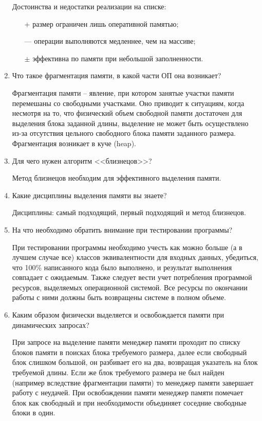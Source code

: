 \begin{enumerate}
	Достоинства и недостатки реализации на списке: 
	
	\begin{itemize}
		\item[+] размер ограничен лишь оперативной памятью;
		\item[---] операции выполняются медленнее, чем на массиве;
		\item[$\pm$] эффективна по памяти при небольшой заполненности.
	\end{itemize}

	\item Что такое фрагментация памяти, в какой части ОП она возникает?
	
	Фрагментация памяти -- явление, при котором занятые участки памяти перемешаны со свободными участками. Оно приводит к ситуациям, когда несмотря на то, что физический объем свободной памяти достаточен для выделения блока заданной длины, выделение не может быть осуществлено из-за отсутствия цельного свободного блока памяти заданного размера. Фрагментация возникает в куче (heap).
	
	\item Для чего нужен алгоритм <<близнецов>>?

	Метод близнецов необходим для эффективного выделения памяти.
	
	\item Какие дисциплины выделения памяти вы знаете?
	
	Дисциплины: самый подходящий, первый подходящий и метод близнецов.
	
	\item На  что  необходимо  обратить  внимание  при  тестировании программы? 
	
	При тестировании программы необходимо учесть как можно больше (а в  лучшем  случае  все)  классов  эквивалентности  для  входных  данных, убедиться,  что  100\%  написанного  кода  было  выполнено,  и  результат выполнения совпадает с ожидаемым. 
	Также  следует  вести  учет  потребления  программой  ресурсов, выделяемых операционной системой. Все ресурсы по окончании работы с ними должны быть возвращены системе в полном объеме.
	
	\item Каким образом физически выделяется и освобождается памяти при динамических запросах?
	
	При  запросе  на  выделение  памяти  менеджер  памяти  проходит  по списку  блоков  памяти  в  поисках  блока  требуемого  размера,  далее  если свободный блок слишком большой, он разбивает его на два, возвращая указатель на блок требуемой длины. Если же блок требуемого размера не был  найден  (например  вследствие  фрагментации  памяти)  то  менеджер памяти завершает работу с неудачей. 
	При  освобождении  памяти  менеджер  памяти  помечает  блок  как свободный и при необходимости объединяет соседние свободные блоки в один. 
	
	
\end{enumerate}

